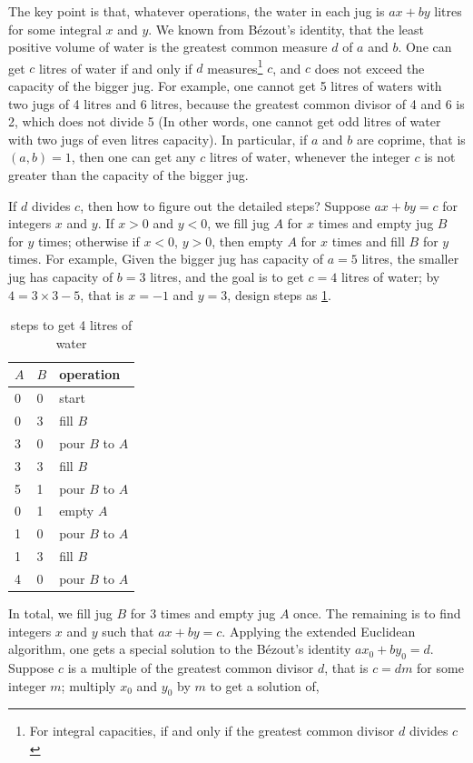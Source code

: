 \documentclass[b5paper]{article}
\begin{document}
The key point is that, whatever operations, the water in each jug is $ax + by$ litres for some integral $x$ and $y$. We known from Bézout's identity, that the least positive volume of water is the greatest common measure $d$ of $a$ and $b$. One can get $c$ litres of water if and only if $d$ measures\footnote{For integral capacities, if and only if the greatest common divisor $d$ divides $c$} $c$, and $c$ does not exceed the capacity of the bigger jug. For example, one cannot get 5 litres of waters with two jugs of 4 litres and 6 litres, because the greatest common divisor of 4 and 6 is 2, which does not divide 5 (In other words, one cannot get odd litres of water with two jugs of even litres capacity). In particular, if $a$ and $b$ are coprime, that is $(a, b) = 1$, then one can get any $c$ litres of water, whenever the integer $c$ is not greater than the capacity of the bigger jug.

If $d$ divides $c$, then how to figure out the detailed steps? Suppose $ax + by = c$ for integers $x$ and $y$. If $x > 0$ and $y < 0$, we fill jug $A$ for $x$ times and empty jug $B$ for $y$ times; otherwise if $x < 0$, $y > 0$, then empty $A$ for $x$ times and fill $B$ for $y$ times. For example, Given the bigger jug has capacity of $a=5$ litres, the smaller jug has capacity of $b=3$ litres, and the goal is to get $c=4$ litres of water; by $4 = 3 \times 3 - 5$, that is $x = -1$ and $y = 3$, design steps as \cref{tab:designed-jugs-ops}.

\begin{table}[htbp]
\centering
\begin{tabular}{l|l|l}
$A$ & $B$ & operation \\
\hline
0 & 0 & start \\
0 & 3 & fill $B$ \\
3 & 0 & pour $B$ to $A$ \\
3 & 3 & fill $B$ \\
5 & 1 & pour $B$ to $A$ \\
0 & 1 & empty $A$ \\
1 & 0 & pour $B$ to $A$ \\
1 & 3 & fill $B$ \\
4 & 0 & pour $B$ to $A$ \\
\end{tabular}
\caption{steps to get 4 litres of water} \label{tab:designed-jugs-ops}
\end{table}

In total, we fill jug $B$ for 3 times and empty jug $A$ once. The remaining is to find integers $x$ and $y$ such that $ax + by = c$. Applying the extended Euclidean algorithm, one gets a special solution to the Bézout's identity $ax_0 + by_0 = d$. Suppose $c$ is a multiple of the greatest common divisor $d$, that is $c = dm$ for some integer $m$; multiply $x_0$ and $y_0$ by $m$ to get a solution of,
\end{document}
